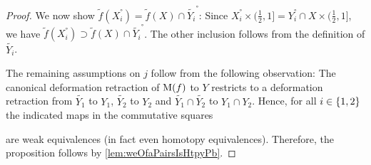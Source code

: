 \begin{lemma}
\begin{proof}
        We now show $\widetilde{f}(X_i^°)=\widetilde{f}(X)\cap \widetilde{Y_i}^°$: 
        Since $X_i^°\times(\frac{1}{2},1]=Y_i^°\cap X\times(\frac{1}{2},1]$, we have $\widetilde{f}(X_i^°)\supset \widetilde{f}(X)\cap \widetilde{Y_i}^°$.
        The other inclusion follows from the definition of $\widetilde{Y_i}$.

        The remaining assumptions on $j$ follow from the following observation: 
        The canonical deformation retraction of $\operatorname{M}(f)$ to $Y$ restricts to a deformation retraction from $\widetilde{Y_1}$ to $Y_1$, $\widetilde{Y_2}$ to $Y_2$ and $\widetilde{Y_1}\cap\widetilde{Y_2}$ to $Y_1\cap Y_2$.
        Hence, for all $i\in\left\lbrace1,2\right\rbrace$ the indicated maps in the commutative squares
        \begin{center} 
        \end{center} 
        are weak equivalences (in fact even homotopy equivalences).
        Therefore, the proposition follows by \cref{lem:weOfaPairsIsHtpyPb}.
    \end{proof}
\end{lemma}

